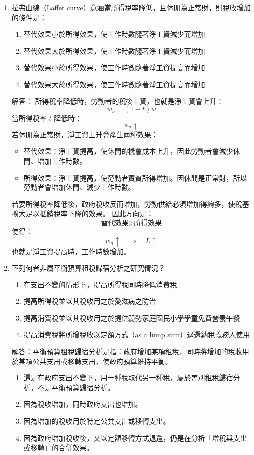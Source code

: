 \documentclass[12pt, a4paper]{article}
\begin{document}
\begin{enumerate}
    \item 拉弗曲線（Laffer curve）意涵當所得稅率降低，且休閒為正常財，則稅收增加的條件是：
    \begin{enumerate}[label=\Alph*.]
        \item 替代效果小於所得效果，使工作時數隨著淨工資減少而增加
        \item 替代效果大於所得效果，使工作時數隨著淨工資減少而增加
        \item 替代效果小於所得效果，使工作時數隨著淨工資提高而增加
        \item 替代效果大於所得效果，使工作時數隨著淨工資提高而增加
    \end{enumerate}
    解答：
    所得稅率降低時，勞動者的稅後工資，也就是淨工資會上升：
    \[
    w_n = (1-t)w
    \]
    當所得稅率 \(t\) 降低時：
    \[
    w_n \uparrow
    \]
    若休閒為正常財，淨工資上升會產生兩種效果：
    \begin{itemize}
        \item 替代效果：淨工資提高，使休閒的機會成本上升，因此勞動者會減少休閒、增加工作時數。
        \item 所得效果：淨工資提高，使勞動者實質所得增加。因休閒是正常財，所以勞動者會增加休閒、減少工作時數。
    \end{itemize}
    若要所得稅率降低後，政府稅收反而增加，勞動供給必須增加得夠多，使稅基擴大足以抵銷稅率下降的效果。
    因此方向是：
    \[
    \text{替代效果} > \text{所得效果}
    \]
    使得：
    \[
    w_n \uparrow \quad \Rightarrow \quad L \uparrow
    \]
    也就是淨工資提高時，工作時數增加。

    \item 下列何者非屬平衡預算租稅歸宿分析之研究情況？
    \begin{enumerate}[label=\Alph*.]
        \item 在支出不變的情形下，提高所得稅同時降低消費稅
        \item 提高所得稅並以其稅收用之於愛滋病之防治
        \item 提高消費稅並以其稅收用之於提供弱勢家庭國民小學學童免費營養午餐
        \item 提高消費稅將所增稅收以定額方式（as a lump sum）退還納稅義務人使用
    \end{enumerate}
    解答：平衡預算租稅歸宿分析是指：政府增加某項租稅，同時將增加的稅收用於某項公共支出或移轉支出，使政府預算維持平衡。
    \begin{enumerate}[label=\Alph*.]
        \item 這是在政府支出不變下，用一種稅取代另一種稅，屬於差別租稅歸宿分析，不是平衡預算歸宿分析。
        \item 因為稅收增加，同時政府支出也增加。
        \item 因為增加的稅收用於特定公共支出或移轉支出。
        \item 因為政府增加稅收後，又以定額移轉方式退還，仍是在分析「增稅與支出或移轉」的合併效果。
    \end{enumerate}



\end{enumerate}
\end{document}
